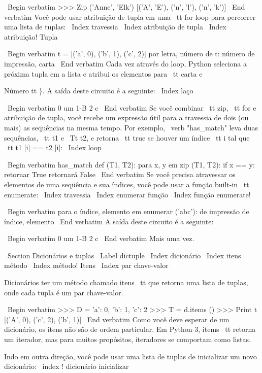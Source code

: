 \documentclass[10pt]{book}
\begin{document}
{{{{{{{{\ Begin {verbatim}
>>> Zip ('Anne', 'Elk')
[('A', 'E'), ('n', 'l'), ('n', 'k')]
\ End {verbatim}
%
Você pode usar atribuição de tupla em uma {\ tt for} loop para percorrer uma lista de
tuplas:
\ Index {travessia}
\ Index {atribuição de tupla}
\ Index {atribuição! Tupla}

\ Begin {verbatim}
t = [('a', 0), ('b', 1), ('c', 2)]
por letra, número de t:
    número de impressão, carta
\ End {verbatim}
%
Cada vez através do loop, Python seleciona a próxima tupla em
a lista e atribui os elementos para {\ tt carta} e 
{Número tt \}. A saída deste circuito é a seguinte:
\ Index {laço}

\ Begin {verbatim}
0 um
1-B
2 c
\ End {verbatim}
%
Se você combinar {\ tt zip}, {\ tt for} e atribuição de tupla, você recebe um
expressão útil para a travessia de dois (ou mais) as sequências na mesma
tempo. Por exemplo, \ verb "has_match" leva duas sequências, {\ tt t1} e
{\ Tt t2}, e retorna {\ tt true} se houver um índice {\ tt i}
tal que {\ tt t1 [i] == t2 [i]}:
\ Index {loop}

\ Begin {verbatim}
has_match def (T1, T2):
    para x, y em zip (T1, T2):
        if x == y:
            retornar True
    retornará False
\ End {verbatim}
%
Se você precisa atravessar os elementos de uma seqüência e sua
índices, você pode usar a função built-in {\ tt enumerate}:
\ Index {travessia}
\ Index {enumerar função}
\ Index {função enumerate!}

\ Begin {verbatim}
para o índice, elemento em enumerar ('abc'):
    de impressão de índice, elemento
\ End {verbatim}
%
A saída deste circuito é a seguinte:

\ Begin {verbatim}
0 um
1-B
2 c
\ End {verbatim}
%
Mais uma vez.


\ Section {Dicionários e tuplas}
\ Label {} dictuple
\ Index {} dicionário
\ Index {itens método}
\ Index {método! Itens}
\ Index {par chave-valor}

Dicionários ter um método chamado {itens \ tt} que retorna uma lista de
tuplas, onde cada tupla é um par chave-valor.

\ Begin {verbatim}
>>> D = {'a': 0, 'b': 1, 'c': 2}
>>> T = d.items ()
>>> Print t
[('A', 0), ('c', 2), ('b', 1)]
\ End {verbatim}
%
Como você deve esperar de um dicionário, os itens não são de
ordem particular. Em Python 3, {items \ tt} retorna um iterador,
mas para muitos propósitos, iteradores se comportam como listas.

Indo em outra direção, você pode usar uma lista de tuplas de
inicializar um novo dicionário: \ index {! dicionário inicializar}

}}}}}}}}}
\end{document}

